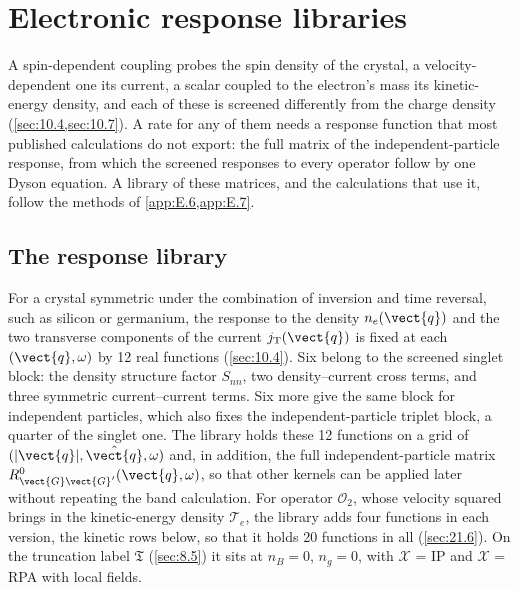 \section{Electronic response libraries}\label{app:E.16}

A spin-dependent coupling probes the spin density of the crystal, a velocity-dependent one its current, a scalar coupled to the electron's mass its kinetic-energy density, and each of these is screened differently from the charge density (\cref{sec:10.4,sec:10.7}). A rate for any of them needs a response function that most published calculations do not export: the full matrix of the independent-particle response, from which the screened responses to every operator follow by one Dyson equation. A library of these matrices, and the calculations that use it, follow the methods of \cref{app:E.6,app:E.7}.

\subsection{The response library}

For a crystal symmetric under the combination of inversion and time reversal, such as silicon or germanium, the response to the density $n_e(\vect{q})$ and the two transverse components of the current $j_{\mathrm{T}}(\vect{q})$ is fixed at each $(\vect{q},\omega)$ by 12 real functions (\cref{sec:10.4}). Six belong to the screened singlet block: the density structure factor $S_{nn}$, two density--current cross terms, and three symmetric current--current terms. Six more give the same block for independent particles, which also fixes the independent-particle triplet block, a quarter of the singlet one. The library holds these 12 functions on a grid of $(|\vect{q}|,\hat{\vect{q}},\omega)$ and, in addition, the full independent-particle matrix $R^0_{\vect{G}\vect{G}'}(\vect{q},\omega)$, so that other kernels can be applied later without repeating the band calculation. For operator $\mathcal{O}_2$, whose velocity squared brings in the kinetic-energy density $\mathcal{T}_e$, the library adds four functions in each version, the kinetic rows below, so that it holds 20 functions in all (\cref{sec:21.6}). On the truncation label $\mathfrak{T}$ (\cref{sec:8.5}) it sits at $n_B = 0$, $n_g = 0$, with $\mathcal{X}$ = IP and $\mathcal{X}$ = RPA with local fields.

